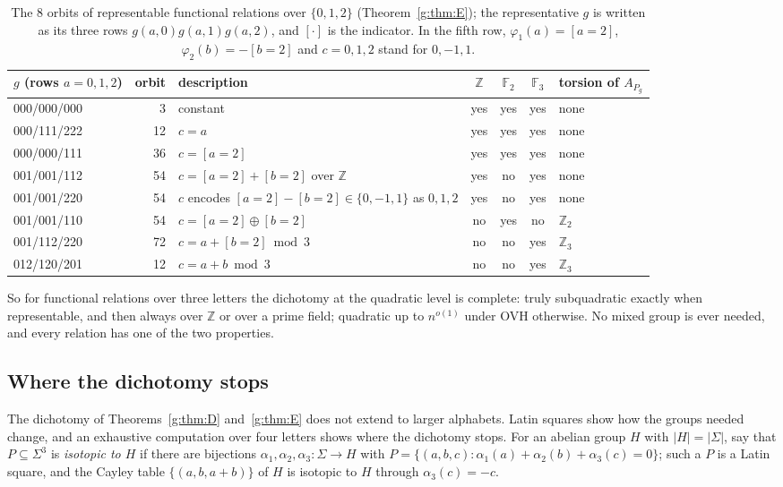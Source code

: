 \documentclass[11pt]{article}
\theoremstyle{definition}
\theoremstyle{remark}
\newcommand{\Z}{\mathbb{Z}}
\newcommand{\F}{\mathbb{F}_2}
\begin{document}
\begin{table}[ht]
\centering\small
\renewcommand{\arraystretch}{1.1}
\begin{tabular}{@{}l r >{\raggedright}p{5.6cm} c c c l@{}}
$g$ (rows $a=0,1,2$) & orbit & description & $\Z$ & $\F$ & $\mathbb F_3$ & torsion of $A_{P_g}$\\\hline
000/000/000 & 3 & constant & yes & yes & yes & none\\
000/111/222 & 12 & $c=a$ & yes & yes & yes & none\\
000/000/111 & 36 & $c=[a=2]$ & yes & yes & yes & none\\
001/001/112 & 54 & $c=[a=2]+[b=2]$ over $\Z$ & yes & no & yes & none\\
001/001/220 & 54 & $c$ encodes $[a=2]-[b=2]\in\{0,-1,1\}$ as $0,1,2$ & yes & no & yes & none\\
001/001/110 & 54 & $c=[a=2]\oplus[b=2]$ & no & yes & no & $\Z_2$\\
001/112/220 & 72 & $c=a+[b=2]\bmod3$ & no & no & yes & $\Z_3$\\
012/120/201 & 12 & $c=a+b\bmod3$ & no & no & yes & $\Z_3$
\end{tabular}
\caption{The $8$ orbits of representable functional relations over $\{0,1,2\}$ (Theorem~\ref{g:thm:E}); the representative $g$ is written as its three rows $g(a,0)g(a,1)g(a,2)$, and $[\cdot]$ is the indicator. In the fifth row, $\varphi_1(a)=[a=2]$, $\varphi_2(b)=-[b=2]$ and $c=0,1,2$ stand for $0,-1,1$.}
\label{g:tab:functional}
\end{table}

So for functional relations over three letters the dichotomy at the quadratic level is complete: truly subquadratic exactly when representable, and then always over $\Z$ or over a prime field; quadratic up to $n^{o(1)}$ under OVH otherwise. No mixed group is ever needed, and every relation has one of the two properties.

\subsection{Where the dichotomy stops}\label{g:sec:stop}

The dichotomy of Theorems~\ref{g:thm:D} and~\ref{g:thm:E} does not extend to larger alphabets. Latin squares show how the groups needed change, and an exhaustive computation over four letters shows where the dichotomy stops. For an abelian group $H$ with $|H|=|\Sigma|$, say that $P\subseteq\Sigma^3$ is \emph{isotopic to $H$} if there are bijections $\alpha_1,\alpha_2,\alpha_3\colon\Sigma\to H$ with $P=\{(a,b,c):\alpha_1(a)+\alpha_2(b)+\alpha_3(c)=0\}$; such a $P$ is a Latin square, and the Cayley table $\{(a,b,a+b)\}$ of $H$ is isotopic to $H$ through $\alpha_3(c)=-c$.
\end{document}
